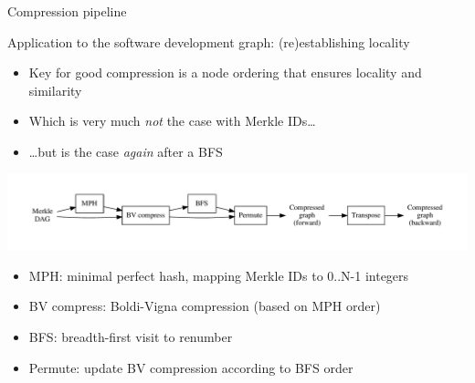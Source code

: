 \documentclass[aspectratio=169,xcolor=table]{beamer}
\begin{document}
    \begin{frame}{Compression pipeline}
        \begin{block}{Application to the software development graph: (re)establishing locality}
            \begin{itemize}
                \item Key for good compression is a node ordering that ensures locality and
                    similarity
                \item Which is very much \emph{not} the case with Merkle IDs\ldots{}
                \item \ldots{}but is the case \emph{again} after a BFS
            \end{itemize}
        \end{block}
        \begin{center}
            \includegraphics[width=1\linewidth]{../img/compression/compression_steps-nofiles}
        \end{center}
        \vspace{-1cm}
        \begin{itemize}
            \item \alert{MPH:} minimal perfect hash, mapping Merkle IDs to 0..N-1 integers
            \item \alert{BV compress:} Boldi-Vigna compression (based on MPH order)
            \item \alert{BFS:} breadth-first visit to renumber
            \item \alert{Permute:} update BV compression according to BFS order
        \end{itemize}
    \end{frame}
\end{document}
